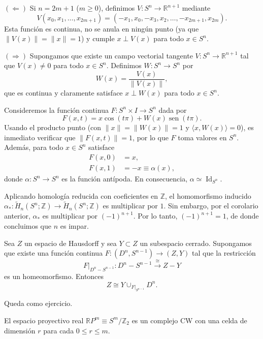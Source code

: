 \begin{dem}
$(\Leftarrow)$ Si $n = 2m + 1$ ($m \geq 0$), definimos $V \colon S^n \to \mathbb{R}^{n+1}$ mediante
\[
V(x_0, x_1, \dots, x_{2m+1}) = (-x_1, x_0, -x_3, x_2, \dots, -x_{2m+1}, x_{2m}).
\]
Esta función es continua, no se anula en ningún punto (ya que $\|V(x)\| = \|x\| = 1$) y cumple $x \perp V(x)$ para todo $x \in S^n$.

$(\Rightarrow)$ Supongamos que existe un campo vectorial tangente $V \colon S^n \to \mathbb{R}^{n+1}$ tal que $V(x) \neq 0$ para todo $x \in S^n$. Definimos $W \colon S^n \to S^n$ por
\[
W(x) = \frac{V(x)}{\|V(x)\|},
\]
que es continua y claramente satisface $x \perp W(x)$ para todo $x \in S^n$.

Consideremos la función continua $F \colon S^n \times I \to S^n$ dada por
\[
F(x, t) = x\cos(t\pi) + W(x)\operatorname{sen}(t\pi).
\]
Usando el producto punto (con $\|x\| = \|W(x)\| = 1$ y $\langle x, W(x) \rangle = 0$), es inmediato verificar que $\|F(x, t)\| = 1$, por lo que $F$ toma valores en $S^n$. Además, para todo $x \in S^n$ satisface
\begin{align*}
F(x, 0) &= x, \\
F(x, 1) &= -x \equiv \alpha(x),
\end{align*}
donde $\alpha \colon S^n \to S^n$ es la función antípoda. En consecuencia, $\alpha \simeq \operatorname{Id}_{S^n}$.

Aplicando homología reducida con coeficientes en $\mathbb{Z}$, el homomorfismo inducido $\alpha_* \colon \widetilde{H}_n(S^n; \mathbb{Z}) \to \widetilde{H}_n(S^n; \mathbb{Z})$ es multiplicar por $1$. Sin embargo, por el corolario anterior, $\alpha_*$ es multiplicar por $(-1)^{n+1}$. Por lo tanto, $(-1)^{n+1} = 1$, de donde concluimos que $n$ es impar.
\end{dem}
\begin{prop}
Sea $Z$ un espacio de Hausdorff y sea $Y \subset Z$ un subespacio cerrado. Supongamos que existe una función continua $F \colon (D^n, S^{n-1}) \to (Z, Y)$ tal que la restricción
\[
F|_{D^n - S^{n-1}} \colon D^n - S^{n-1} \xrightarrow{\;\cong\;} Z - Y
\]
es un homeomorfismo. Entonces
\[
Z \cong Y \cup_{F|_{S^{n-1}}} D^n.
\]
\end{prop}

\begin{dem}
Queda como ejercicio.
\end{dem}

\begin{lema}
El espacio proyectivo real $\mathbb{R}P^m \equiv S^m / \mathbb{Z}_2$ es un complejo CW con una celda de dimensión $r$ para cada $0 \leq r \leq m$.
\end{lema}


